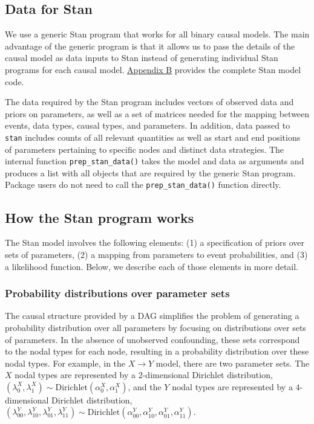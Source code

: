 \documentclass[
  11pt,
  article]{jss}
\begin{document}
\subsection{Data for Stan}\label{data-for-stan}

We use a generic Stan program that works for all binary causal models.
The main advantage of the generic program is that it allows us to pass
the details of the causal model as data inputs to Stan instead of
generating individual Stan programs for each causal model.
\hyperref[sec-stancode]{Appendix B} provides the complete Stan model
code.

The data required by the Stan program includes vectors of observed data
and priors on parameters, as well as a set of matrices needed for the
mapping between events, data types, causal types, and parameters. In
addition, data passed to \texttt{stan} includes counts of all relevant
quantities as well as start and end positions of parameters pertaining
to specific nodes and distinct data strategies. The internal function
\texttt{prep\_stan\_data()} takes the model and data as arguments and
produces a list with all objects that are required by the generic Stan
program. Package users do not need to call the
\texttt{prep\_stan\_data()} function directly.

\subsection{How the Stan program
works}\label{how-the-stan-program-works}

The Stan model involves the following elements: (1) a specification of
priors over sets of parameters, (2) a mapping from parameters to event
probabilities, and (3) a likelihood function. Below, we describe each of
those elements in more detail.

\subsubsection{Probability distributions over parameter
sets}\label{probability-distributions-over-parameter-sets}

The causal structure provided by a DAG simplifies the problem of
generating a probability distribution over all parameters by focusing on
distributions over sets of parameters. In the absence of unobserved
confounding, these sets correspond to the nodal types for each node,
resulting in a probability distribution over these nodal types. For
example, in the \(X \rightarrow Y\) model, there are two parameter sets.
The \(X\) nodal types are represented by a 2-dimensional Dirichlet
distribution,
\((\lambda^X_0, \lambda^X_1) \sim \text{Dirichlet}(\alpha^X_0, \alpha^X_1)\),
and the \(Y\) nodal types are represented by a \(4\)-dimensional
Dirichlet distribution,
\((\lambda^Y_{00}, \lambda^Y_{10}, \lambda^Y_{01}, \lambda^Y_{11}) \sim \text{Dirichlet}(\alpha^Y_{00}, \alpha^Y_{10}, \alpha^Y_{01}, \alpha^Y_{11})\).
\end{document}
